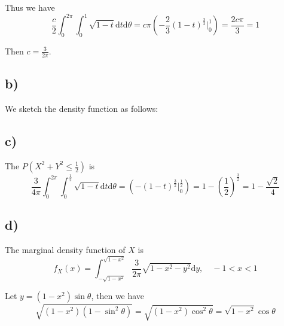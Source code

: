 \documentclass[a4paper, UTF-8]{article}
\theoremstyle{plain}
\begin{document}
Thus we have
$$
\frac{c}{2} \int_{0}^{2\pi} \int_{0}^1 \sqrt{1 - t} \mathrm{d}t \mathrm{d}\theta = c\pi (-\frac{2}{3}(1 - t)^{\frac{3}{2}} \big|_{0}^1)= \frac{2c\pi}{3} =  1
$$

Then $c = \frac{3}{2\pi}$.

\subsection{b)} 

We sketch the density function as follows:

\begin{center}
\end{center}

\subsection{c)} 

The $P(X^2 + Y^2 \leq \frac{1}{2})$ is 
$$
\frac{3}{4\pi} \int_{0}^{2\pi} \int_{0}^\frac{1}{2} \sqrt{1 - t} \mathrm{d}t \mathrm{d}\theta = (-(1 - t)^{\frac{3}{2}} \big|_{0}^\frac{1}{2}) = 1 - \left(\frac{1}{2}\right)^{\frac{3}{2}} = 1 - \frac{\sqrt{2}}{4}
$$



\subsection{d)} 

The marginal density function of $X$ is
$$
f_X(x) = \int_{-\sqrt{1-x^2}}^{\sqrt{1-x^2}} \frac{3}{2\pi}\sqrt{1 - x^2 - y^2} \mathrm{d}y, \quad -1 < x < 1
$$

Let $y = (1-x^2)\sin \theta$, then we have
$$
\sqrt{(1-x^2)(1-\sin^2 \theta)} = \sqrt{(1-x^2)\cos^2 \theta} = \sqrt{1-x^2}\cos \theta
$$
\end{document}
